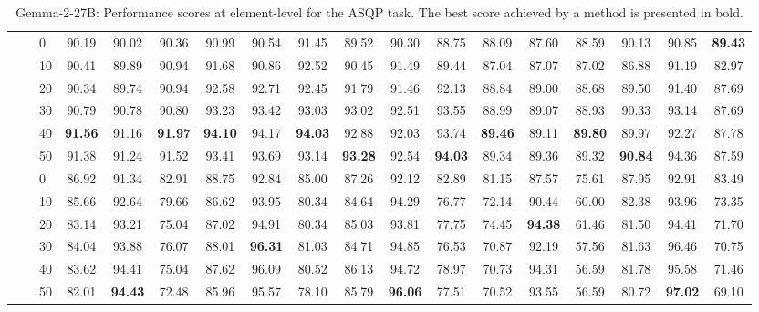 \begin{table*}[!h]
{\begin{tabular}{lllccc|ccc|ccc|ccc|ccc}
\hline
\arrayrulecolor{gray}\cline{2-18}\arrayrulecolor{black}
\textbf{\multirow{12}{*}{Sentiment Polarity}} & \textbf{\multirow{6}{*}{-}} & 0 & 90.19 & 90.02 & 90.36 & 90.99 & 90.54 & 91.45 & 89.52 & 90.30 & 88.75 & 88.09 & 87.60 & 88.59 & 90.13 & 90.85 & \textbf{89.43} \\ 
 \textbf{} & \textbf{} & 10 & 90.41 & 89.89 & 90.94 & 91.68 & 90.86 & 92.52 & 90.45 & 91.49 & 89.44 & 87.04 & 87.07 & 87.02 & 86.88 & 91.19 & 82.97 \\ 
 \textbf{} & \textbf{} & 20 & 90.34 & 89.74 & 90.94 & 92.58 & 92.71 & 92.45 & 91.79 & 91.46 & 92.13 & 88.84 & 89.00 & 88.68 & 89.50 & 91.40 & 87.69 \\ 
 \textbf{} & \textbf{} & 30 & 90.79 & 90.78 & 90.80 & 93.23 & 93.42 & 93.03 & 93.02 & 92.51 & 93.55 & 88.99 & 89.07 & 88.93 & 90.33 & 93.14 & 87.69 \\ 
 \textbf{} & \textbf{} & 40 & \textbf{91.56} & 91.16 & \textbf{91.97} & \textbf{94.10} & 94.17 & \textbf{94.03} & 92.88 & 92.03 & 93.74 & \textbf{89.46} & 89.11 & \textbf{89.80} & 89.97 & 92.27 & 87.78 \\ 
 \textbf{} & \textbf{} & 50 & 91.38 & 91.24 & 91.52 & 93.41 & 93.69 & 93.14 & \textbf{93.28} & 92.54 & \textbf{94.03} & 89.34 & 89.36 & 89.32 & \textbf{90.84} & 94.36 & 87.59 \\ 
 \arrayrulecolor{gray}\cline{2-18}\arrayrulecolor{black}
\textbf{} & \textbf{\multirow{6}{*}{SC}} & 0 & 86.92 & 91.34 & 82.91 & 88.75 & 92.84 & 85.00 & 87.26 & 92.12 & 82.89 & 81.15 & 87.57 & 75.61 & 87.95 & 92.91 & 83.49 \\ 
 \textbf{} & \textbf{} & 10 & 85.66 & 92.64 & 79.66 & 86.62 & 93.95 & 80.34 & 84.64 & 94.29 & 76.77 & 72.14 & 90.44 & 60.00 & 82.38 & 93.96 & 73.35 \\ 
 \textbf{} & \textbf{} & 20 & 83.14 & 93.21 & 75.04 & 87.02 & 94.91 & 80.34 & 85.03 & 93.81 & 77.75 & 74.45 & \textbf{94.38} & 61.46 & 81.50 & 94.41 & 71.70 \\ 
 \textbf{} & \textbf{} & 30 & 84.04 & 93.88 & 76.07 & 88.01 & \textbf{96.31} & 81.03 & 84.71 & 94.85 & 76.53 & 70.87 & 92.19 & 57.56 & 81.63 & 96.46 & 70.75 \\ 
 \textbf{} & \textbf{} & 40 & 83.62 & 94.41 & 75.04 & 87.62 & 96.09 & 80.52 & 86.13 & 94.72 & 78.97 & 70.73 & 94.31 & 56.59 & 81.78 & 95.58 & 71.46 \\ 
 \textbf{} & \textbf{} & 50 & 82.01 & \textbf{94.43} & 72.48 & 85.96 & 95.57 & 78.10 & 85.79 & \textbf{96.06} & 77.51 & 70.52 & 93.55 & 56.59 & 80.72 & \textbf{97.02} & 69.10 \\ 
\hline
\end{tabular}
}
\caption{Gemma-2-27B: Performance scores at element-level for the ASQP task. The best score achieved by a method is presented in bold.}\label{fig:performance-scores-element-asqp}
\end{table*}


